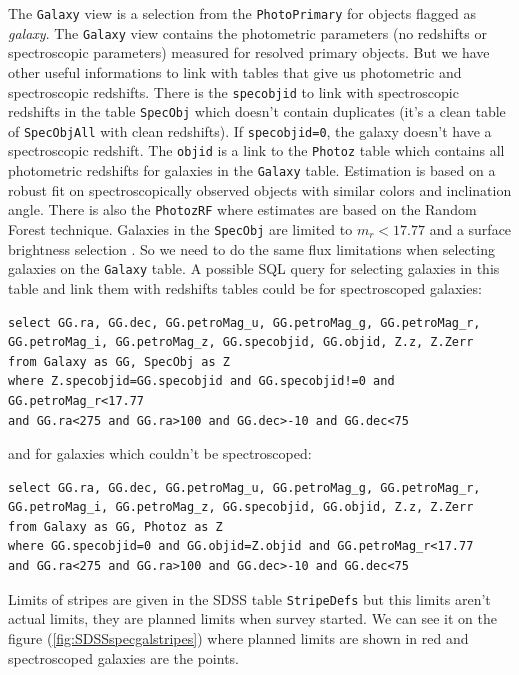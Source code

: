 The \texttt{Galaxy} view is a selection from the \texttt{PhotoPrimary} for
objects flagged as \emph{galaxy}. The \texttt{Galaxy} view contains the
photometric parameters (no redshifts or spectroscopic parameters) measured for
resolved primary objects. But we have other useful informations to link with
tables that give us photometric and spectroscopic redshifts. There is the
\texttt{specobjid} to link with spectroscopic redshifts in the table
\texttt{SpecObj} which doesn't contain duplicates (it's a clean table of
\texttt{SpecObjAll} with clean redshifts). If \texttt{specobjid=0}, the galaxy
doesn't have a spectroscopic redshift. The \texttt{objid} is a link to the
\texttt{Photoz} table which contains all photometric redshifts for galaxies in
the \texttt{Galaxy} table. Estimation is based on a robust fit on
spectroscopically observed objects with similar colors and inclination angle.
There is also the \texttt{PhotozRF} where estimates are based on the Random
Forest technique. Galaxies in the \texttt{SpecObj} are limited to $m_r<17.77$
and a surface brightness selection . So we need to do the same
flux limitations when selecting galaxies on the \texttt{Galaxy} table. A
possible SQL query for selecting galaxies in this table and link them with
redshifts tables could be for spectroscoped galaxies:
\begin{listing}[H]
\begin{verbatim}
select GG.ra, GG.dec, GG.petroMag_u, GG.petroMag_g, GG.petroMag_r,
GG.petroMag_i, GG.petroMag_z, GG.specobjid, GG.objid, Z.z, Z.Zerr
from Galaxy as GG, SpecObj as Z
where Z.specobjid=GG.specobjid and GG.specobjid!=0 and GG.petroMag_r<17.77
and GG.ra<275 and GG.ra>100 and GG.dec>-10 and GG.dec<75
\end{verbatim}
\end{listing}
\noindent and for galaxies which couldn't be spectroscoped:
\begin{listing}[H]
\begin{verbatim}
select GG.ra, GG.dec, GG.petroMag_u, GG.petroMag_g, GG.petroMag_r,
GG.petroMag_i, GG.petroMag_z, GG.specobjid, GG.objid, Z.z, Z.Zerr
from Galaxy as GG, Photoz as Z
where GG.specobjid=0 and GG.objid=Z.objid and GG.petroMag_r<17.77
and GG.ra<275 and GG.ra>100 and GG.dec>-10 and GG.dec<75
\end{verbatim}
\end{listing}

Limits of stripes are given in the SDSS table \texttt{StripeDefs} but this
limits aren't actual limits, they are planned limits when survey started. We
can see it on the figure (\ref{fig:SDSSspecgalstripes}) where planned limits
are shown in red and spectroscoped galaxies are the points.

